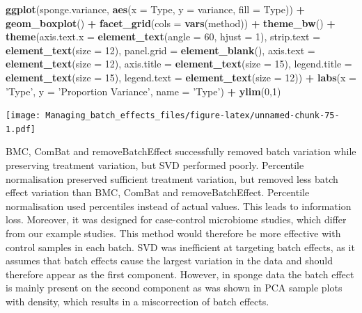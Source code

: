 \documentclass[]{book}
\newenvironment{Shaded}{\begin{snugshade}}{\end{snugshade}}
\newcommand{\KeywordTok}[1]{\textcolor[rgb]{0.13,0.29,0.53}{\textbf{#1}}}
\newcommand{\DataTypeTok}[1]{\textcolor[rgb]{0.13,0.29,0.53}{#1}}
\newcommand{\DecValTok}[1]{\textcolor[rgb]{0.00,0.00,0.81}{#1}}
\newcommand{\StringTok}[1]{\textcolor[rgb]{0.31,0.60,0.02}{#1}}
\newcommand{\OperatorTok}[1]{\textcolor[rgb]{0.81,0.36,0.00}{\textbf{#1}}}
\newcommand{\NormalTok}[1]{#1}
\begin{document}
\begin{Shaded}
\begin{Highlighting}[]
\KeywordTok{ggplot}\NormalTok{(sponge.variance, }\KeywordTok{aes}\NormalTok{(}\DataTypeTok{x =}\NormalTok{ Type, }\DataTypeTok{y =}\NormalTok{ variance, }\DataTypeTok{fill =}\NormalTok{ Type)) }\OperatorTok{+}\StringTok{ }
\StringTok{  }\KeywordTok{geom_boxplot}\NormalTok{() }\OperatorTok{+}\StringTok{ }\KeywordTok{facet_grid}\NormalTok{(}\DataTypeTok{cols =} \KeywordTok{vars}\NormalTok{(method)) }\OperatorTok{+}\StringTok{ }\KeywordTok{theme_bw}\NormalTok{() }\OperatorTok{+}\StringTok{ }
\StringTok{  }\KeywordTok{theme}\NormalTok{(}\DataTypeTok{axis.text.x =} \KeywordTok{element_text}\NormalTok{(}\DataTypeTok{angle =} \DecValTok{60}\NormalTok{, }\DataTypeTok{hjust =} \DecValTok{1}\NormalTok{), }
        \DataTypeTok{strip.text =} \KeywordTok{element_text}\NormalTok{(}\DataTypeTok{size =} \DecValTok{12}\NormalTok{), }\DataTypeTok{panel.grid =} \KeywordTok{element_blank}\NormalTok{(), }
        \DataTypeTok{axis.text =} \KeywordTok{element_text}\NormalTok{(}\DataTypeTok{size =} \DecValTok{12}\NormalTok{), }\DataTypeTok{axis.title =} \KeywordTok{element_text}\NormalTok{(}\DataTypeTok{size =} \DecValTok{15}\NormalTok{), }
        \DataTypeTok{legend.title =} \KeywordTok{element_text}\NormalTok{(}\DataTypeTok{size =} \DecValTok{15}\NormalTok{), }\DataTypeTok{legend.text =} \KeywordTok{element_text}\NormalTok{(}\DataTypeTok{size =} \DecValTok{12}\NormalTok{)) }\OperatorTok{+}\StringTok{ }
\StringTok{  }\KeywordTok{labs}\NormalTok{(}\DataTypeTok{x =} \StringTok{'Type'}\NormalTok{, }\DataTypeTok{y =} \StringTok{'Proportion Variance'}\NormalTok{, }\DataTypeTok{name =} \StringTok{'Type'}\NormalTok{) }\OperatorTok{+}\StringTok{ }\KeywordTok{ylim}\NormalTok{(}\DecValTok{0}\NormalTok{,}\DecValTok{1}\NormalTok{)}
\end{Highlighting}
\end{Shaded}

\texttt{[image: Managing\_batch\_effects\_files/figure-latex/unnamed-chunk-75-1.pdf]}

BMC, ComBat and removeBatchEffect successfully removed batch variation
while preserving treatment variation, but SVD performed poorly.
Percentile normalisation preserved sufficient treatment variation, but
removed less batch effect variation than BMC, ComBat and
removeBatchEffect. Percentile normalisation used percentiles instead of
actual values. This leads to information loss. Moreover, it was designed
for case-control microbiome studies, which differ from our example
studies. This method would therefore be more effective with control
samples in each batch. SVD was inefficient at targeting batch effects,
as it assumes that batch effects cause the largest variation in the data
and should therefore appear as the first component. However, in sponge
data the batch effect is mainly present on the second component as was
shown in PCA sample plots with density, which results in a miscorrection
of batch effects.
\end{document}
